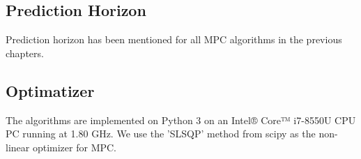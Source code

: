 \subsection{Prediction Horizon}

Prediction horizon has been mentioned for all MPC algorithms in the previous chapters.

\subsection{Optimatizer}

The algorithms are implemented on Python 3 on an Intel® Core™ i7-8550U CPU PC running at 1.80
GHz. We use the ’SLSQP’ method from scipy as the non-linear optimizer for MPC.
